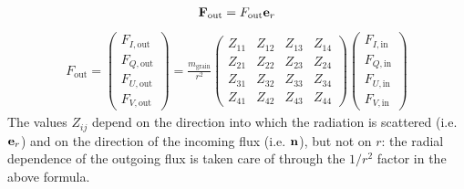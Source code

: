 \documentclass[letterpaper,10pt,english]{sphinxmanual}
\begin{document}
\begin{equation*}
\begin{split}{\bf F}_{\mathrm{out}} = F_{\mathrm{out}}{\bf e}_r\end{split}
\end{equation*}\begin{equation*}
\begin{split}F_{\mathrm{out}} = \left(\begin{matrix}
F_{I,\mathrm{out}}\\
F_{Q,\mathrm{out}}\\
F_{U,\mathrm{out}}\\
F_{V,\mathrm{out}}
\end{matrix}\right)
=\frac{m_{\mathrm{grain}}}{r^2}
\left(\begin{matrix}
Z_{11} & Z_{12} & Z_{13} & Z_{14} \\
Z_{21} & Z_{22} & Z_{23} & Z_{24} \\
Z_{31} & Z_{32} & Z_{33} & Z_{34} \\
Z_{41} & Z_{42} & Z_{43} & Z_{44}
\end{matrix}\right)
\left(\begin{matrix}
F_{I,\mathrm{in}}\\
F_{Q,\mathrm{in}}\\
F_{U,\mathrm{in}}\\
F_{V,\mathrm{in}}
\end{matrix}\right)\end{split}
\end{equation*}
The values \(Z_{ij}\) depend on the direction into which the radiation is
scattered (i.e. \({\bf e}_r\)) and on the direction of the incoming flux
(i.e. \({\bf n}\)), but not on \(r\): the radial dependence of the
outgoing flux is taken care of through the \(1/r^2\) factor in the above
formula.
\end{document}

